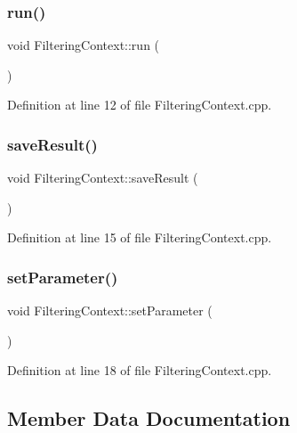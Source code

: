 \subsubsection{\texorpdfstring{run()}{run()}}
{\footnotesize\ttfamily void Filtering\+Context\+::run (\begin{DoxyParamCaption}{ }\end{DoxyParamCaption})}



Definition at line 12 of file Filtering\+Context.\+cpp.

\mbox{\label{classbfl_1_1FilteringContext_a77f5148a9365e4257554b1594cb45c8e}} 
\subsubsection{\texorpdfstring{save\+Result()}{saveResult()}}
{\footnotesize\ttfamily void Filtering\+Context\+::save\+Result (\begin{DoxyParamCaption}{ }\end{DoxyParamCaption})}



Definition at line 15 of file Filtering\+Context.\+cpp.

\mbox{\label{classbfl_1_1FilteringContext_a21b4c61a64a36aff518200aac5031d45}} 
\subsubsection{\texorpdfstring{set\+Parameter()}{setParameter()}}
{\footnotesize\ttfamily void Filtering\+Context\+::set\+Parameter (\begin{DoxyParamCaption}{ }\end{DoxyParamCaption})}



Definition at line 18 of file Filtering\+Context.\+cpp.



\subsection{Member Data Documentation}
\mbox{\label{classbfl_1_1FilteringContext_a143316c648445254fdd512f317a81d5e}} 
